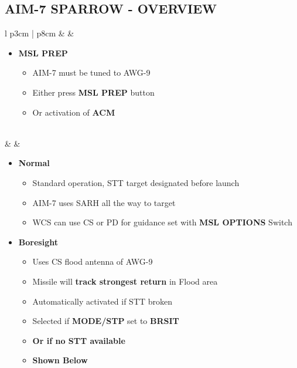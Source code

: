 \documentclass[8pt,usenames,dvipsnames,twoside]{article}
\begin{document}
	\subsection{AIM-7 SPARROW - OVERVIEW}
	\begin{center}
		\begin{longtable}{l p{3cm} | p{8cm}}
			\toprule
			\textbullet &  \hfill \null {} \thumbnar &
			\begin{minipage}[t]{\linewidth}
				\vspace{-7pt}
				\begin{itemize}
					\item \textbf{MSL PREP}
					\begin{itemize}
						\item AIM-7 must be tuned to AWG-9
						\item Either press \textbf{MSL PREP} button
						\item Or activation of \textbf{ACM}
					\end{itemize}
				\end{itemize}
			\end{minipage} \\
			\midrule
			\textbullet &  &
			\begin{minipage}[t]{\linewidth}
				\vspace{-7pt}
				\begin{itemize}
					\item \textbf{Normal}
					\begin{itemize}
						\item Standard operation, STT target designated before launch
						\item AIM-7 uses SARH all the way to target
						\item WCS can use CS or PD for guidance set with \textbf{MSL OPTIONS} Switch
					\end{itemize}
					\item \textbf{Boresight}
					\begin{itemize}
						\item Uses CS flood antenna of AWG-9
						\item Missile will \textbf{track strongest return} in Flood area
						\item Automatically activated if STT broken
						\item Selected if \textbf{MODE/STP} set to \textbf{BRSIT}
						\item \textbf{Or if no STT available}
						\item \textbf{Shown Below}

\end{itemize}
\end{itemize}
\end{minipage}
\end{longtable}
\end{center}
\end{document}
